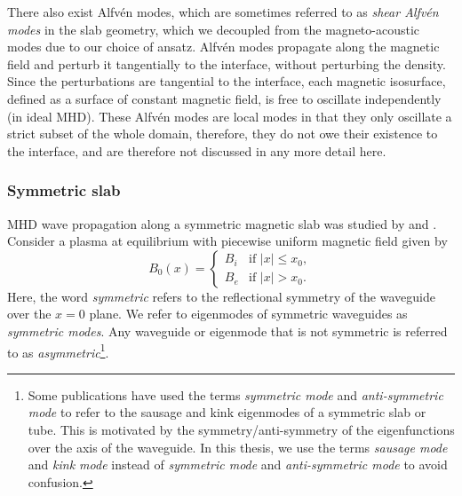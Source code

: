 There also exist Alfv\'{e}n modes, which are sometimes referred to as \textit{shear Alfv\'{e}n modes} in the slab geometry, which we decoupled from the magneto-acoustic modes due to our choice of ansatz. Alfv\'{e}n modes propagate along the magnetic field and perturb it tangentially to the interface, without perturbing the density. Since the perturbations are tangential to the interface, each magnetic isosurface, defined as a surface of constant magnetic field, is free to oscillate independently (in ideal MHD). These Alfv\'{e}n modes are local modes in that they only oscillate a strict subset of the whole domain, therefore, they do not owe their existence to the interface, and are therefore not discussed in any more detail here.


\subsubsection{Symmetric slab} \label{sec: MHD waves sym slab}

MHD wave propagation along a symmetric magnetic slab was studied by \cite{rob81b} and \cite{edw_etal82}. Consider a plasma at equilibrium  with piecewise uniform magnetic field given by
\begin{equation}
B_0(x) =
\begin{cases}
B_i & \text{if } |x| \leq x_0, \\
B_e & \text{if } |x| > x_0.
\end{cases}
\end{equation}
Here, the word \textit{symmetric} refers to the reflectional symmetry of the waveguide over the $x = 0$ plane. We refer to eigenmodes of symmetric waveguides as \textit{symmetric modes}. Any waveguide or eigenmode that is not symmetric is referred to as \textit{asymmetric}\footnote{Some publications have used the terms \textit{symmetric mode} and \textit{anti-symmetric mode} to refer to the sausage and kink eigenmodes of a symmetric slab or tube. This is motivated by the symmetry/anti-symmetry of the eigenfunctions over the axis of the waveguide. In this thesis, we use the terms \textit{sausage mode} and \textit{kink mode} instead of \textit{symmetric mode} and \textit{anti-symmetric mode} to avoid confusion.}.

